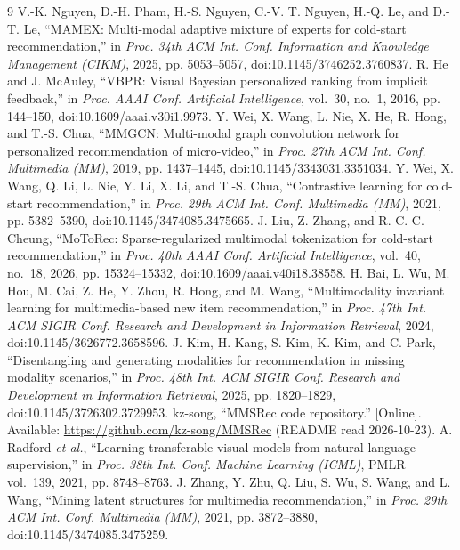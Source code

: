 \documentclass[conference]{IEEEtran}
\begin{document}
\begin{thebibliography}{9}
 V.-K. Nguyen, D.-H. Pham, H.-S. Nguyen, C.-V. T. Nguyen, H.-Q. Le, and D.-T. Le, ``{MAMEX}: Multi-modal adaptive mixture of experts for cold-start recommendation,'' in \emph{Proc. 34th ACM Int. Conf. Information and Knowledge Management (CIKM)}, 2025, pp. 5053--5057, doi:10.1145/3746252.3760837.
 R. He and J. McAuley, ``{VBPR}: Visual Bayesian personalized ranking from implicit feedback,'' in \emph{Proc. AAAI Conf. Artificial Intelligence}, vol.~30, no.~1, 2016, pp. 144--150, doi:10.1609/aaai.v30i1.9973.
 Y. Wei, X. Wang, L. Nie, X. He, R. Hong, and T.-S. Chua, ``{MMGCN}: Multi-modal graph convolution network for personalized recommendation of micro-video,'' in \emph{Proc. 27th ACM Int. Conf. Multimedia (MM)}, 2019, pp. 1437--1445, doi:10.1145/3343031.3351034.
 Y. Wei, X. Wang, Q. Li, L. Nie, Y. Li, X. Li, and T.-S. Chua, ``Contrastive learning for cold-start recommendation,'' in \emph{Proc. 29th ACM Int. Conf. Multimedia (MM)}, 2021, pp. 5382--5390, doi:10.1145/3474085.3475665.
 J. Liu, Z. Zhang, and R. C. C. Cheung, ``{MoToRec}: Sparse-regularized multimodal tokenization for cold-start recommendation,'' in \emph{Proc. 40th AAAI Conf. Artificial Intelligence}, vol.~40, no.~18, 2026, pp. 15324--15332, doi:10.1609/aaai.v40i18.38558.
 H. Bai, L. Wu, M. Hou, M. Cai, Z. He, Y. Zhou, R. Hong, and M. Wang, ``Multimodality invariant learning for multimedia-based new item recommendation,'' in \emph{Proc. 47th Int. ACM SIGIR Conf. Research and Development in Information Retrieval}, 2024, doi:10.1145/3626772.3658596.
 J. Kim, H. Kang, S. Kim, K. Kim, and C. Park, ``Disentangling and generating modalities for recommendation in missing modality scenarios,'' in \emph{Proc. 48th Int. ACM SIGIR Conf. Research and Development in Information Retrieval}, 2025, pp. 1820--1829, doi:10.1145/3726302.3729953.
 kz-song, ``{MMSRec} code repository.'' [Online]. Available: \url{https://github.com/kz-song/MMSRec} (README read 2026-10-23).
 A. Radford \emph{et al.}, ``Learning transferable visual models from natural language supervision,'' in \emph{Proc. 38th Int. Conf. Machine Learning (ICML)}, PMLR vol.~139, 2021, pp. 8748--8763.
 J. Zhang, Y. Zhu, Q. Liu, S. Wu, S. Wang, and L. Wang, ``Mining latent structures for multimedia recommendation,'' in \emph{Proc. 29th ACM Int. Conf. Multimedia (MM)}, 2021, pp. 3872--3880, doi:10.1145/3474085.3475259.
\end{thebibliography}
\end{document}
